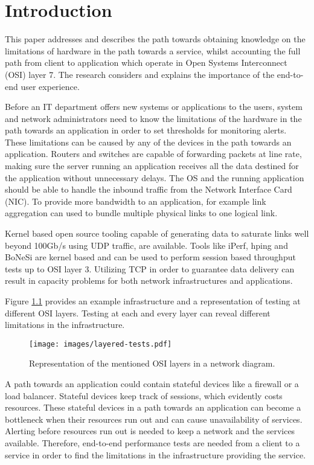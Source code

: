 \chapter{Introduction}\label{ch:intro}

This paper addresses and describes the path towards obtaining knowledge on the limitations of hardware in the path towards a service, whilst accounting the full path from client to application which operate in Open Systems Interconnect (OSI) layer 7. 
The research considers and explains the importance of the end-to-end user experience.

Before an IT department offers new systems or applications to the users, system and network administrators need to know the limitations of the hardware in the path towards an application in order to set thresholds for monitoring alerts. 
These limitations can be caused by any of the devices in the path towards an application.
Routers and switches are capable of forwarding packets at line rate, making sure the server running an application receives all the data destined for the application without unnecessary delays.
The OS and the running application should be able to handle the inbound traffic from the  Network Interface Card (NIC). 
To provide more bandwidth to an application, for example link aggregation can used to bundle multiple physical links to one logical link.

Kernel based open source tooling capable of generating data to saturate links well beyond 100Gb/s using UDP traffic, are available.  
Tools like iPerf\cite{iperf}, hping\cite{hping} and BoNeSi\cite{bonesi} are kernel based and can be used to perform session based throughput tests up to OSI layer 3.  
Utilizing TCP in order to guarantee data delivery can result in capacity problems for both network infrastructures and applications. 

Figure \ref{fig:layeredtesting} provides an example infrastructure and a representation of testing at different OSI layers.
Testing at each and every layer can reveal different limitations in the infrastructure.

\begin{figure}[H]
  \texttt{[image: images/layered-tests.pdf]}
  \caption{Representation of the mentioned OSI layers in a network diagram.}
  \label{fig:layeredtesting}
\end{figure}

A path towards an application could contain stateful devices like a firewall or a load balancer. 
Stateful devices keep track of sessions, which evidently costs resources. 
These stateful devices in a path towards an application can become a bottleneck when their resources run out and can cause unavailability of services.
Alerting before resources run out is needed to keep a network and the services available.  
Therefore, end-to-end performance tests are needed from a client to a service in order to find the limitations in the infrastructure providing the service.

